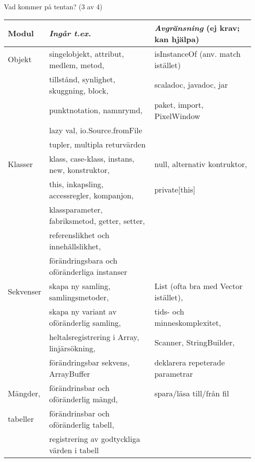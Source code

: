 \begin{Slide}{Vad kommer på tentan? (3 av 4)}\SlideFontTiny
\hspace{-2em}\begin{minipage}{1.0\textwidth}
\begin{tabular}{l | l | l}
\textbf{Modul} & \textit{Ingår t.ex.}& \textit{Avgränsning} (ej krav; kan hjälpa)\\\hline
Objekt      & singelobjekt, attribut, medlem, metod, & isInstanceOf (anv. match istället) \\
            & tillstånd, synlighet, skuggning, block, & scaladoc, javadoc, jar \\
            & punktnotation, namnrymd,  & paket, import, PixelWindow \\
            & lazy val, io.Source.fromFile  &  \\
            & tupler, multipla returvärden &  \\
\hline

Klasser     &  klass, case-klass, instans, new, konstruktor, & null, alternativ kontruktor, \\
            &  this, inkapsling, accessregler, kompanjon, & private[this] \\
            &  klassparameter, fabriksmetod, getter, setter, & \\
            &  referenslikhet och innehållslikhet,    & \\
            &  förändringsbara och oföränderliga instanser & \\
\hline

Sekvenser  &  skapa ny samling, samlingsmetoder, &   List (ofta bra med Vector istället), \\
            & skapa ny variant av oföränderlig samling, & tids- och minneskomplexitet, \\
            &  heltalsregistrering i Array, linjärsökning, & Scanner, StringBuilder,\\
            &  förändringsbar sekvens, ArrayBuffer & deklarera repeterade parametrar\\
\hline

Mängder, & förändrinsbar och oföränderlig mängd,  & spara/läsa till/från fil \\%
tabeller & förändrinsbar och oföränderlig tabell, & \\%
         & registrering av godtyckliga värden i tabell  & \\
\hline

\end{tabular}
\end{minipage}
\end{Slide}


